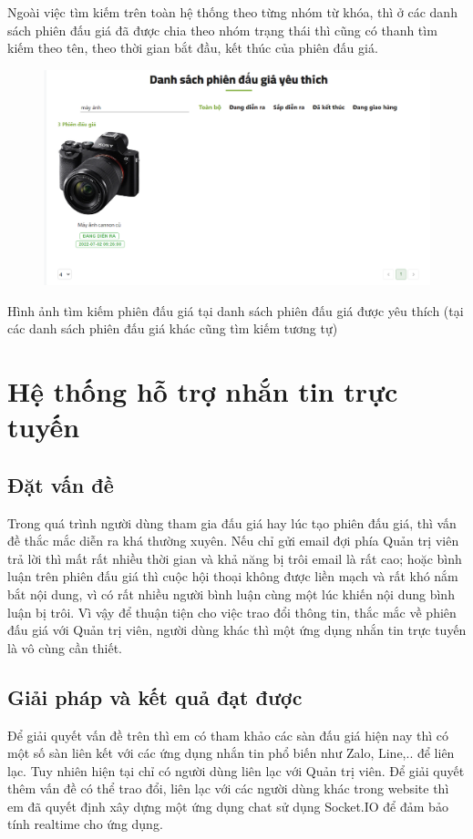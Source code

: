 \documentclass[../DoAn.tex]{subfiles}
\begin{document}
Ngoài việc tìm kiếm trên toàn hệ thống theo từng nhóm từ khóa, thì ở các danh sách phiên đấu giá đã được chia theo nhóm trạng thái thì cũng có thanh tìm kiếm theo tên, theo thời gian bắt đầu, kết thúc của phiên đấu giá. 
\begin{figure}[H]
    \centering
    \includegraphics[width=0.75\linewidth,height=6.25cm]{Hinhve/searchlike.png}
\end{figure}
Hình ảnh tìm kiếm phiên đấu giá tại danh sách phiên đấu giá được yêu thích (tại các danh sách phiên đấu giá khác cũng tìm kiếm tương tự)
\section{Hệ thống hỗ trợ nhắn tin trực tuyến}
\subsection{Đặt vấn đề}
Trong quá trình người dùng tham gia đấu giá hay lúc tạo phiên đấu giá, thì vấn đề thắc mắc diễn ra khá thường xuyên.  Nếu chỉ gửi email đợi phía Quản trị viên trả lời thì mất rất nhiều thời gian và khả năng bị trôi email là rất cao; hoặc bình luận trên phiên đấu giá thì cuộc hội thoại không được liền mạch và rất khó nắm bắt nội dung, vì có rất nhiều người bình luận cùng một lúc khiến nội dung bình luận bị trôi. Vì vậy để thuận tiện cho việc trao đổi thông tin, thắc mắc về phiên đấu giá với Quản trị viên, người dùng khác thì một ứng dụng nhắn tin trực tuyến là vô cùng cần thiết. 
\subsection{Giải pháp và kết quả đạt được}
Để giải quyết vấn đề trên thì em có tham khảo các sàn đấu giá hiện nay thì có một số sàn liên kết với các ứng dụng nhắn tin phổ biến như Zalo, Line,.. để liên lạc. Tuy nhiên hiện tại chỉ có người dùng liên lạc với Quản trị viên. Để giải quyết thêm vấn đề có thể trao đổi, liên lạc với các người dùng khác trong website thì em đã quyết định xây dựng một ứng dụng chat sử dụng Socket.IO để đảm bảo tính realtime cho ứng dụng.
\end{document}
